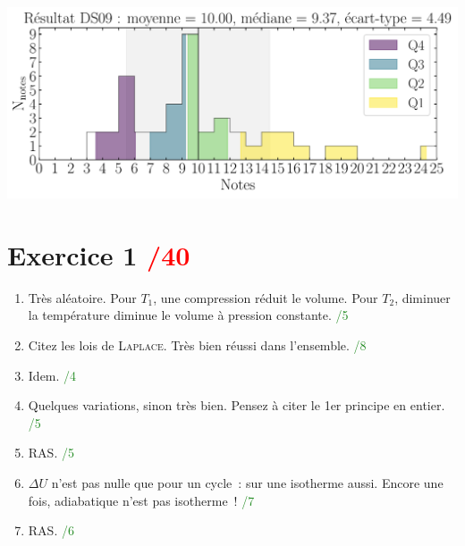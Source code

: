 \documentclass[a4paper, 11pt, final, garamond]{book}
\begin{document}
\begin{center}
    \includegraphics[width=\linewidth]{res_DS09.pdf}
\end{center}
\vspace*{-20pt}

\section{Exercice 1 \hfill \textcolor{red}{/40}}
\begin{enumerate}
  \item Très aléatoire. Pour $T_1$, une compression réduit le volume. Pour
    $T_2$, diminuer la température diminue le volume à pression constante.
    \hfill \textcolor{ForestGreen}{/5}
  \item Citez les lois de \textsc{Laplace}. Très bien réussi dans l'ensemble.
    \hfill \textcolor{ForestGreen}{/8}
  \item Idem.
    \hfill \textcolor{ForestGreen}{/4}
  \item Quelques variations, sinon très bien. Pensez à citer le 1er principe en
    entier.
    \hfill \textcolor{ForestGreen}{/5}
  \item RAS.
    \hfill \textcolor{ForestGreen}{/5}
  \item $\Delta{U}$ n'est pas nulle que pour un cycle~: sur une isotherme aussi.
    Encore une fois, adiabatique n'est pas isotherme~!
    \hfill \textcolor{ForestGreen}{/7}
  \item RAS.
    \hfill \textcolor{ForestGreen}{/6}
\end{enumerate}
\end{document}
